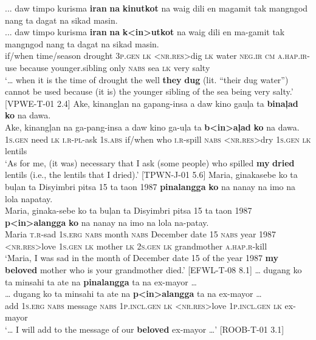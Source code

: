 \ea
\label{bkm:Ref474827251}
... daw  timpo  kurisma  \textbf{iran}  \textbf{na}  \textbf{kinutkot}  na  waig  dili  en magamit  tak  mangngod  nang  ta  dagat  na  sikad  masin. \smallskip\\
\gll ... daw  timpo  kurisma  \textbf{iran}  \textbf{na}  \textbf{k<in>utkot}  na  waig  dili  en ma-gamit  tak  mangngod  nang  ta  dagat  na  sikad  masin. \\
{} if/when  time/season  drought  3\textsc{p.gen}  \textsc{lk}  <\textsc{nr.res}>dig  \textsc{lk}  water  \textsc{neg.ir}  \textsc{cm}
\textsc{a.hap.ir}-use  because  younger.sibling  only  \textsc{nabs}  sea  \textsc{lk}  very  salty \\
\glt `… when it is the time of drought the well \textbf{they} \textbf{dug} (lit. “their dug water”) cannot be used because (it is) the younger sibling of the sea being very salty.’ [VPWE-T-01 2.4]
\z
\ea
Ake,  kinangļan  na  gapang-insa  a  daw  kino  gauļa  ta \textbf{binaļad  ko} na  dawa. \smallskip\\
\gll Ake,  kinangļan  na  ga-pang-insa  a  daw  kino  ga-uļa  ta \textbf{b<in>aļad}  \textbf{ko} na  dawa. \\
1\textsc{s.gen}  need  \textsc{lk} \textsc{i.r}-\textsc{pl}-ask  1\textsc{s.abs}  if/when  who  \textsc{i.r}-spill  \textsc{nabs}
<\textsc{nr.res}>dry  1\textsc{s.gen}  \textsc{lk}  lentils \\
\glt `As for me, (it was) necessary that I ask (some people) who spilled \textbf{my} \textbf{dried} lentils (i.e., the lentils that I dried).’ [TPWN-J-01 5.6]
\z
\ea
Maria,  ginakasebe   ko  ta  buļan  ta  Disyimbri  pitsa  15  ta taon  1987  \textbf{pinalangga}  \textbf{ko}  na  nanay  na  imo  na  lola  napatay. \smallskip\\
\gll Maria,  ginaka-sebe\footnotemark{}   ko  ta  buļan  ta  Disyimbri  pitsa  15  ta taon  1987  \textbf{p<in>alangga}  \textbf{ko}  na  nanay  na  imo  na  lola  na-patay. \\
Maria  \textsc{t.r}-sad  1\textsc{s.erg}  \textsc{nabs}  month  \textsc{nabs}  December  date  15  \textsc{nabs}
year  1987  <\textsc{nr.res}>love  1\textsc{s.gen}  \textsc{lk}  mother  \textsc{lk}  2\textsc{s.gen}  \textsc{lk}  grandmother  \textsc{a.hap.r}-kill \\
\glt `Maria, I was sad in the month of December date 15 of the year 1987 \textbf{my} \textbf{beloved} mother who is your grandmother died.’ [EFWL-T-08 8.1]
\z
\ea
… dugang  ko  ta  minsahi  ta  ate  na  \textbf{pinalangga} ta  na  ex-mayor … \smallskip\\
\gll … dugang  ko  ta  minsahi  ta  ate  na  \textbf{p<in>alangga} ta  na  ex-mayor … \\
{}   add  1\textsc{s.erg}  \textsc{nabs}  message  \textsc{nabs}  1\textsc{p.incl.gen}  \textsc{lk}  <\textsc{nr.res}>love
1\textsc{p.incl.gen}  \textsc{lk}  ex-mayor \\
\glt `… I will add to the message of our \textbf{beloved} ex-mayor …’ [ROOB-T-01 3.1]
\z

